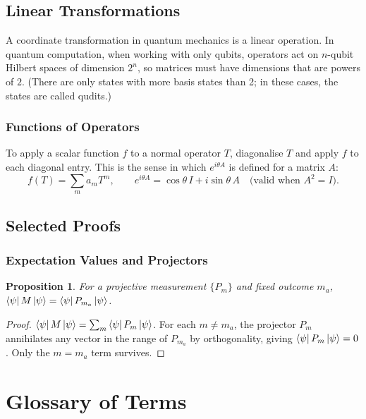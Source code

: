 \documentclass[12pt, a4paper, oneside]{report}
\theoremstyle{plain}
\newtheorem{proposition}[theorem]{Proposition}
\theoremstyle{definition}
\theoremstyle{remark}
\begin{document}
\section{Linear Transformations}

A coordinate transformation in quantum mechanics is a linear operation. In quantum
computation, when working with only qubits, operators act on $n$-qubit Hilbert spaces of dimension $2^n$, so matrices must
have dimensions that are powers of $2$. (There are only states with more basis states than 2; in these cases, the states are called qudits.)


\subsection{Functions of Operators}

To apply a scalar function $f$ to a normal operator $T$, diagonalise $T$ and apply $f$ to
each diagonal entry. This is the sense in which $e^{i\theta A}$ is defined for a matrix $A$:
\[
  f(T) = \sum_m a_m T^m, \qquad e^{i\theta A} = \cos\theta\, I + i\sin\theta\, A
  \quad \text{(valid when } A^2 = I\text{)}.
\]

\section{Selected Proofs}


\subsection{Expectation Values and Projectors}

\begin{proposition}
For a projective measurement $\{P_m\}$ and fixed outcome $m_a$,
$\bra{\psi}M\ket{\psi} = \bra{\psi}P_{m_a}\ket{\psi}$.
\end{proposition}

\begin{proof}
$\bra{\psi}M\ket{\psi} = \sum_m\bra{\psi}P_m\ket{\psi}$. For each $m \neq m_a$, the
projector $P_m$ annihilates any vector in the range of $P_{m_a}$ by orthogonality, giving
$\bra{\psi}P_m\ket{\psi} = 0$. Only the $m = m_a$ term survives.
\end{proof}


\chapter{Glossary of Terms}
\label{app:glossary}
\end{document}
